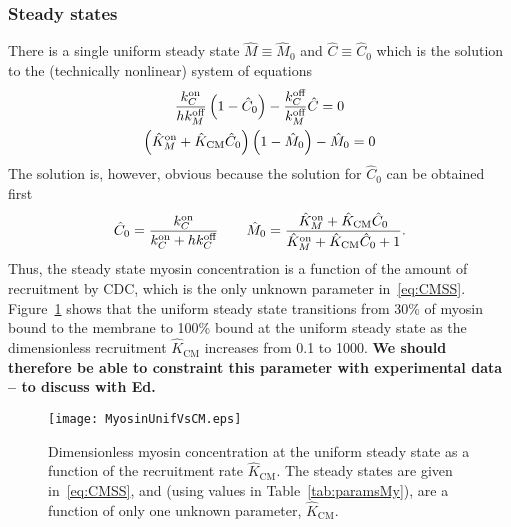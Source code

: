 \documentclass[11pt]{article}
\newcommand{\red}[1]{\color{red}#1\normalcolor}
\newcommand{\6}[1]{#1_{\text{6}}}
\newcommand{\3}[1]{#1_{\text{3}}}
\newcommand{\C}[1]{#1_C}
\newcommand{\My}[1]{#1_M}
\begin{document}
\subsubsection{Steady states}
There is a single uniform steady state $\hat M \equiv \hat M_0$ and $\hat C \equiv \hat C_0$ which is the solution to the (technically nonlinear) system of equations
\begin{subequations}
\label{eq:SteadyMyC}
\begin{gather}
\frac{\C{\kon}}{h \My{\koff}}\left(1-\hat C_0\right)-\frac{\C{\koff}}{\My{\koff}} \hat{C}=0 \\
\left(\hat{K}^\text{on}_M+\hat{K}_\text{CM} \hat{C}_0\right) \left(1-\hat M_0\right) - \hat{M}_0=0
\end{gather}
\end{subequations}
The solution is, however, obvious because the solution for $\hat{C}_0$ can be obtained first
\begin{equation}
\label{eq:CMSS}
\hat{C}_0 = \frac{\C{\kon}}{\C{\kon}+h\C{\koff}} \qquad 
\hat{M}_0 = \frac{\hat{K}^\text{on}_M+\hat{K}_\text{CM} \hat{C}_0}{\hat{K}^\text{on}_M+\hat{K}_\text{CM} \hat{C}_0+1}.
\end{equation}
Thus, the steady state myosin concentration is a function of the amount of recruitment by CDC, which is the only unknown parameter in\ \eqref{eq:CMSS}. Figure\ \ref{fig:MyosinSSCDC} shows that the uniform steady state transitions from 30\% of myosin bound to the membrane to 100\%  bound at the uniform steady state as the dimensionless recruitment $\hat{K}_\text{CM}$ increases from 0.1 to 1000. \red{\textbf{We should therefore be able to constraint this parameter with experimental data -- to discuss with Ed.}}

\begin{figure}
\centering
\texttt{[image: MyosinUnifVsCM.eps]}
\caption{\label{fig:MyosinSSCDC}Dimensionless myosin concentration at the uniform steady state as a function of the recruitment rate $\hat{K}_\text{CM}$. The steady states are given in\ \eqref{eq:CMSS}, and (using values in Table\ \ref{tab:paramsMy}), are a function of only one unknown parameter, $\hat{K}_\text{CM}$.}
\end{figure}
\end{document}
